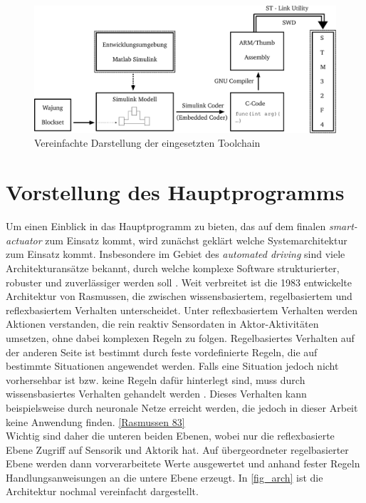 \begin{figure}[H]%
\centering
\includegraphics[width=0.8\columnwidth]{./Bilder/fig_toolchain}%
\caption{Vereinfachte Darstellung der eingesetzten Toolchain}%
\label{fig_toolchain}%
\end{figure}

\section{Vorstellung des Hauptprogramms}
Um einen Einblick in das Hauptprogramm zu bieten, das auf dem finalen \textit{smart-actuator} zum Einsatz kommt, wird zunächst geklärt welche Systemarchitektur zum Einsatz kommt.
Insbesondere im Gebiet des \textit{automated driving} sind viele Architekturansätze bekannt, durch welche komplexe Software strukturierter, robuster und zuverlässiger werden soll \cite{automated}. Weit verbreitet ist die 1983 entwickelte Architektur von Rasmussen, die zwischen wissensbasiertem, regelbasiertem und reflexbasiertem Verhalten unterscheidet. Unter reflexbasiertem Verhalten werden Aktionen verstanden, die rein reaktiv Sensordaten in Aktor-Aktivitäten umsetzen, ohne dabei komplexen Regeln zu folgen. Regelbasiertes Verhalten auf der anderen Seite ist bestimmt durch feste vordefinierte Regeln, die auf bestimmte Situationen angewendet werden. Falls eine Situation jedoch nicht vorhersehbar ist bzw. keine Regeln dafür hinterlegt sind, muss durch wissensbasiertes Verhalten gehandelt werden \cite{automated}. Dieses Verhalten kann beispielsweise durch neuronale Netze erreicht werden, die jedoch in dieser Arbeit keine Anwendung finden. \autoref{Rasmussen 83}\\
Wichtig sind daher die unteren beiden Ebenen, wobei nur die reflexbasierte Ebene Zugriff auf Sensorik und Aktorik hat. Auf übergeordneter regelbasierter Ebene werden dann vorverarbeitete Werte ausgewertet und anhand fester Regeln Handlungsanweisungen an die untere Ebene erzeugt. In \autoref{fig_arch} ist die Architektur nochmal vereinfacht dargestellt.
